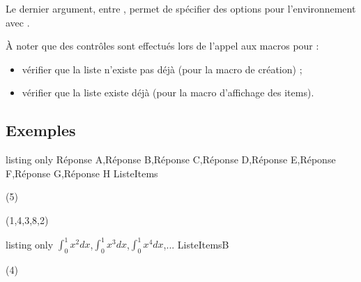 \documentclass[french,11pt,a4paper]{article}
\begin{document}
Le dernier argument, entre , permet de spécifier des options pour l'environnement  avec .

\medskip

À noter que des contrôles sont effectués lors de l'appel aux macros pour :

\begin{itemize}
	\item vérifier que la liste n'existe pas déjà (pour la macro de création) ;
	\item vérifier que la liste existe déjà (pour la macro d'affichage des items).
\end{itemize}
\subsection{Exemples}

\begin{DemoCode}{listing only}
\CreerListeItems%
    {Réponse A,Réponse B,Réponse C,Réponse D,Réponse E,Réponse F,Réponse G,Réponse H}%
    {\malisteditems}{ListeItems}
\end{DemoCode}


\begin{DemoCode}{}
(5)
\end{DemoCode}

\begin{DemoCode}{}
(1,4,3,8,2)
\end{DemoCode}

\begin{DemoCode}{listing only}
\CreerListeItems%
    {{$\int_0^1 x^2 dx$},{$\int_0^1 x^3 dx$},{$\int_0^1 x^4 dx$},...}%
    {\malisteditemsb}{ListeItemsB}
\end{DemoCode}


\begin{DemoCode}{}
(4)
\end{DemoCode}
\end{document}
